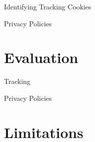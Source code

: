\documentclass[xcolor={dvipsnames}]{beamer}
\begin{document}
\begin{frame}{Identifying Tracking Cookies}

\end{frame}

\begin{frame}{Privacy Policies}

\end{frame}

\section{Evaluation}

\begin{frame}{Tracking}

\end{frame}

\begin{frame}{Privacy Policies}

\end{frame}

\section{Limitations}
\end{document}
